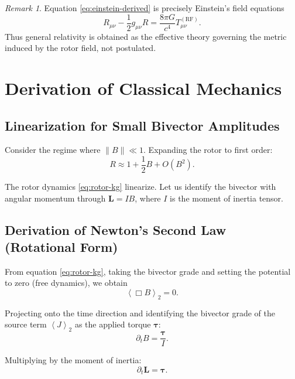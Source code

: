 \documentclass[11pt,a4paper]{article}
\numberwithin{equation}{section}
\theoremstyle{plain}
\theoremstyle{definition}
\theoremstyle{remark}
\newtheorem{remark}[theorem]{Remark}
\newcommand{\grade}[2]{\left\langle #1 \right\rangle_{#2}}
\newcommand{\biv}[1]{\grade{#1}{2}}        %
\begin{document}
\begin{remark}
Equation \eqref{eq:einstein-derived} is precisely Einstein's field equations
\begin{equation}
R_{\mu\nu} - \frac{1}{2}g_{\mu\nu}R = \frac{8\pi G}{c^4}T_{\mu\nu}^{(\mathrm{RF})}.
\end{equation}
Thus general relativity is obtained as the effective theory governing the metric induced by the rotor field, not postulated.
\end{remark}

\section{Derivation of Classical Mechanics}
\label{sec:classical}

\subsection{Linearization for Small Bivector Amplitudes}

Consider the regime where $\|B\| \ll 1$. Expanding the rotor to first order:
\begin{equation}
R \approx 1 + \frac{1}{2}B + O(B^2).
\end{equation}

The rotor dynamics \eqref{eq:rotor-kg} linearize. Let us identify the bivector with angular momentum through $\bm{L} = I B$, where $I$ is the moment of inertia tensor.

\subsection{Derivation of Newton's Second Law (Rotational Form)}

From equation \eqref{eq:rotor-kg}, taking the bivector grade and setting the potential to zero (free dynamics), we obtain
\begin{equation}
\biv{\Box B} = 0.
\end{equation}

Projecting onto the time direction and identifying the bivector grade of the source term $\biv{J}$ as the applied torque $\bm{\tau}$:
\begin{equation}
\partial_t B = \frac{\bm{\tau}}{I}.
\end{equation}

Multiplying by the moment of inertia:
\begin{equation}
\boxed{\partial_t \bm{L} = \bm{\tau}.}
\label{eq:newton-rotational}
\end{equation}
\end{document}
